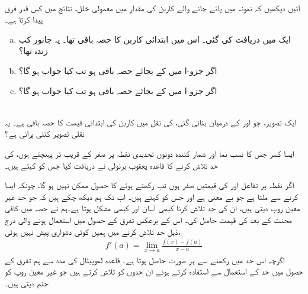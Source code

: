 \\
آئیں دیکھیں کہ نمونہ میں پائے جانے والے کاربن کی مقدار میں معمولی خلل، نتائج میں کس قدر فرق پیدا کرتا ہے۔
\begin{enumerate}[a.]
\item
ایک   میں دریافت کی گئی۔ اس میں ابتدائی کاربن کا  حصہ باقی تھا۔ یہ جانور کب زندہ تھا؟
\item
اگر جزو-ا میں  کے بجائے  حصہ باقی ہو تب کیا جواب ہو گا؟
\item
اگر جزو-ا میں  کے بجائے  حصہ باقی ہو تب کیا جواب ہو گا؟
\end{enumerate}
\\
ایک تصویر، جو  اور  کے درمیان بنائی گئی، کی نقل میں کاربن  کی ابتدائی قیمت کا  حصہ باقی ہے۔ یہ نقلی تصویر کتنی پرانی ہے؟\\




ایسا کسر جس کا نسب نما اور شمار کنندہ دونوں تحدیدی نقطہ پر  صفر  کے قریب تر پہنچتے ہوں، کی حد تلاش کرنے کا قاعدہ یعقوب برنولی نے دریافت کیا جس کو   کہتے ہیں۔

اگر نقطہ  پر تفاعل  اور  کی قیمتیں صفر ہوں تب   رکھتے  ہوئے   کا حصول ممکن نہیں ہو گا، چونکہ ایسا کرنے سے  ملتا ہے جو بے معنی ہے اور  جس کو  کہتے ہیں۔ اب تک ہم دیکھ چکے ہیں کہ جو حد غیر معین روپ  دیتی ہیں، ان کی حد تلاش کرنا   کبھی آسان اور کبھی مشکل ہوتا ہے۔ہم نے حصہ  میں کافی محنت کے بعد  کی قیمت حاصل کی۔ اس کے برعکس تفرق کے حصول میں استعمال ہونے والی درج ذیل حد تلاش کرنے میں ہمیں کوئی دشواری پیش نہیں ہوئی،
\begin{align*}
f'(a)=\lim_{x\to a}\frac{f(x)-f(a)}{x-a}
\end{align*}
اگرچہ اس حد میں   رکھنے سے ہر صورت  حاصل ہوتا ہے۔ قاعدہ لھوپیٹال  کی مدد سے ہم تفرق کے حصول میں حد کے استعمال سے استفادہ کرتے ہوئے ان حدوں  کو تلاش کرتے ہیں جو غیر معین روپ کو جنم دیتی  ہیں۔

